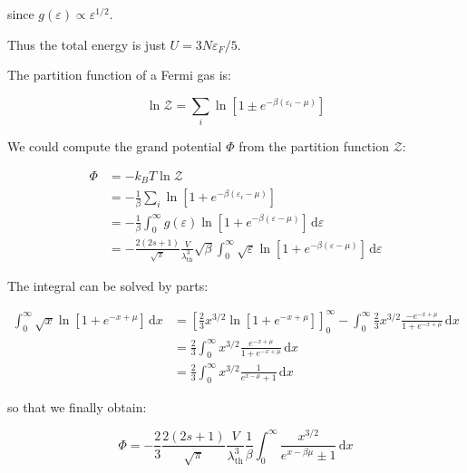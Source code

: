 \documentclass[12pt]{article}
\begin{document}
since $g(\varepsilon) \propto \varepsilon^{1/2}$.

Thus the total energy is just $U = 3N \varepsilon_{F}/5$.

The partition function of a Fermi gas is:

\begin{equation}
    \ln{\mathcal{Z}} = \sum_{i} \ln{\left[ 1 \pm e^{-\beta (\varepsilon_{i} - \mu)} \right]}
\end{equation}

We could compute the grand potential $\Phi$ from the partition function $\mathcal{Z}$:

\begin{equation}
    \begin{split}
        \Phi &= -k_{B}T \ln{\mathcal{Z}} \\
        &= -\frac{1}{\beta} \sum_{i} \ln{\left[ 1 + e^{-\beta (\varepsilon_{i} - \mu)} \right]} \\
        &= -\frac{1}{\beta} \int_{0}^{\infty} g(\varepsilon) \ln{\left[ 1 + e^{-\beta (\varepsilon - \mu)} \right]} \, \mathrm{d}\varepsilon \\
        &= -\frac{2(2s+1)}{\sqrt{\pi}} \frac{V}{\lambda_{\text{th}}^3} \sqrt{\beta} \int_{0}^{\infty} \sqrt{\varepsilon} \ln{\left[ 1 + e^{-\beta (\varepsilon - \mu)} \right]} \, \mathrm{d}\varepsilon
    \end{split}
\end{equation}

The integral can be solved by parts:

\begin{equation}
    \begin{split}
        \int_{0}^{\infty} \sqrt{x} \ln{\left[ 1 + e^{-x + \mu} \right]} \, \mathrm{d}x &= \left[ \frac{2}{3} x^{3/2} \ln{\left[ 1 + e^{-x + \mu} \right]} \right]_{0}^{\infty} - \int_{0}^{\infty} \frac{2}{3} x^{3/2} \frac{-e^{-x + \mu}}{1 + e^{-x + \mu}} \, \mathrm{d}x \\
        &= \frac{2}{3} \int_{0}^{\infty} x^{3/2} \frac{e^{-x + \mu}}{1 + e^{-x + \mu}} \, \mathrm{d}x \\
        &= \frac{2}{3} \int_{0}^{\infty} x^{3/2} \frac{1}{e^{x - \mu} + 1} \, \mathrm{d}x
    \end{split}
\end{equation}

so that we finally obtain:

\begin{equation}
    \Phi = -\frac{2}{3} \frac{2(2s+1)}{\sqrt{\pi}} \frac{V}{\lambda_{\text{th}}^3} \frac{1}{\beta} \int_{0}^{\infty} \frac{x^{3/2}}{e^{x - \beta \mu} \pm 1} \, \mathrm{d}x
\end{equation}
\end{document}
